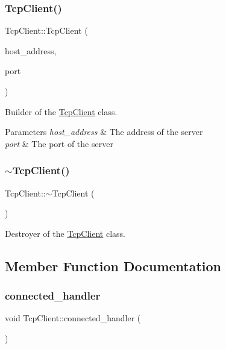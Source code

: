 \subsubsection{\texorpdfstring{TcpClient()}{TcpClient()}\hspace{0.1cm}{\footnotesize\ttfamily [2/2]}}
{\footnotesize\ttfamily Tcp\+Client\+::\+Tcp\+Client (\begin{DoxyParamCaption}\item[{Q\+Host\+Address}]{host\+\_\+address,  }\item[{quint16}]{port }\end{DoxyParamCaption})}



Builder of the \mbox{\hyperlink{class_tcp_client}{Tcp\+Client}} class. 


\begin{DoxyParams}{Parameters}
{\em host\+\_\+address} & The address of the server \\
\hline
{\em port} & The port of the server \\
\hline
\end{DoxyParams}
\mbox{\label{class_tcp_client_a125d2277f401cbdebadb9689a5933e18}} 
\subsubsection{\texorpdfstring{$\sim$TcpClient()}{~TcpClient()}}
{\footnotesize\ttfamily Tcp\+Client\+::$\sim$\+Tcp\+Client (\begin{DoxyParamCaption}{ }\end{DoxyParamCaption})}



Destroyer of the \mbox{\hyperlink{class_tcp_client}{Tcp\+Client}} class. 



\subsection{Member Function Documentation}
\mbox{\label{class_tcp_client_a2467855310250aad604efaabfdccb55c}} 
\subsubsection{\texorpdfstring{connected\_handler}{connected\_handler}}
{\footnotesize\ttfamily void Tcp\+Client\+::connected\+\_\+handler (\begin{DoxyParamCaption}\item[{void}]{ }\end{DoxyParamCaption})\hspace{0.3cm}{\ttfamily [slot]}}



